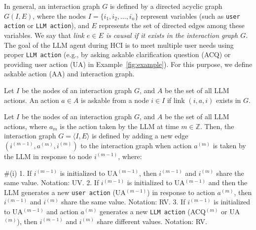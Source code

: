 In general, an interaction graph $G$ is defined by a directed acyclic graph $G(I,E)$, where the nodes $I = \{i_1, i_2, \ldots, i_n\}$ represent variables (such as \texttt{user action} or \texttt{LLM action}), and $E$ represents the set of directed edges among these variables.
We say that \textit{link $e \in E$ is causal if it exists in the interaction graph $G$}.
The goal of the LLM agent during HCI is to meet multiple user needs using proper \texttt{LLM action} (e.g., by asking \colorbox{questioncolor}{askable clarification question} (ACQ) or providing \colorbox{answercolor}{user action} (UA) in Example~\ref{fig:example}).
For this purpose, we define askable action (AA) and interaction graph.
\begin{definition}
    Let $I$ be the nodes of an interaction graph $G$, and $A$ be the set of all LLM actions.
    An action $a \in A$ is askable from a node $i \in I$ if link $(i, a, i)$ exists in $G$.
\end{definition}
\begin{definition}
    Let $I$ be the nodes of an interaction graph $G$, and $A$ be the set of all LLM actions, where $a_m$ is the action taken by the LLM at time $m \in \mathbb{Z}$.
    Then, the interaction graph $G = \langle I, E \rangle$ is defined by adding a new edge $(i^{(m-1)}, a^{(m)}, i^{(m)})$ to the interaction graph when action $a^{(m)}$ is taken by the LLM in response to node $i^{(m-1)}$, where:

    \#\nopagebreak(i)
    1. If $i^{(m-1)}$ is initialized to UA$^{(m-1)}$, then $i^{(m-1)}$ and $i^{(m)}$ share the same value. Notation: UV.
    2. If $i^{(m-1)}$ is initialized to UA$^{(m-1)}$ and then the LLM generates a new \texttt{user action} (UA$^{(m-1)}$) in response to action $a^{(m)}$, then $i^{(m-1)}$ and $i^{(m)}$ share the same value. Notation: RV.
    3. If $i^{(m-1)}$ is initialized to UA$^{(m-1)}$ and action $a^{(m)}$ generates a new \texttt{LLM action} (ACQ$^{(m)}$ or UA$^{(m)}$), then $i^{(m-1)}$ and $i^{(m)}$ share different values. Notation: RV.
\end{definition}

